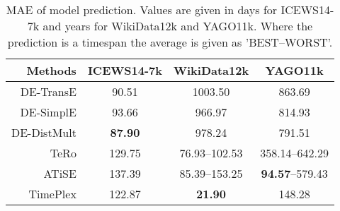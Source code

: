 \begin{table}[htb]
\centering
\begin{minipage}{0.95\columnwidth}
\centering

\caption{MAE of model prediction. Values are given in days for ICEWS14-7k and years for WikiData12k and YAGO11k. Where the prediction is a timespan the average is given as '\textsc{BEST}–\textsc{WORST}'.}
\vspace{-3mm}

\begin{tabular}{r|ccc}
\hline
Methods & ICEWS14-7k & WikiData12k & YAGO11k\\
\hline
DE-TransE & 90.51 & 1003.50 & 863.69\\
DE-SimplE & 93.66 & 966.97 & 814.93\\
DE-DistMult & \textbf{87.90} & 978.24 & 791.51\\
TeRo & 129.75 & 76.93–102.53 & 358.14–642.29\\
ATiSE & 137.39 & 85.39–153.25 & \textbf{94.57}–579.43\\
TimePlex & 122.87 & \textbf{21.90} & 148.28\\
\hline
\end{tabular}


\label{tab:time_prediction_mae}
\end{minipage}
\end{table}